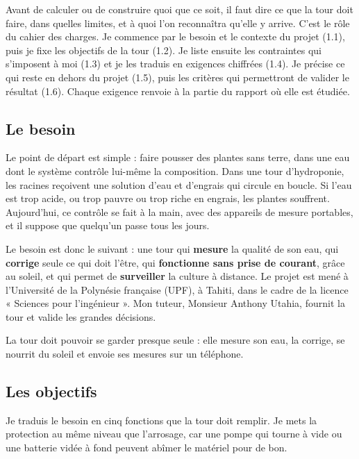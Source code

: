 \clearpage
{}

Avant de calculer ou de construire quoi que ce soit, il faut dire ce que la tour doit faire, dans quelles limites, et à quoi l'on reconnaîtra qu'elle y arrive. C'est le rôle du cahier des charges. Je commence par le besoin et le contexte du projet (1.1), puis je fixe les objectifs de la tour (1.2). Je liste ensuite les contraintes qui s'imposent à moi (1.3) et je les traduis en exigences chiffrées (1.4). Je précise ce qui reste en dehors du projet (1.5), puis les critères qui permettront de valider le résultat (1.6). Chaque exigence renvoie à la partie du rapport où elle est étudiée.

\subsection{Le besoin}

Le point de départ est simple : faire pousser des plantes sans terre, dans une eau dont le système contrôle lui-même la composition. Dans une tour d'hydroponie, les racines reçoivent une solution d'eau et d'engrais qui circule en boucle. Si l'eau est trop acide, ou trop pauvre ou trop riche en engrais, les plantes souffrent. Aujourd'hui, ce contrôle se fait à la main, avec des appareils de mesure portables, et il suppose que quelqu'un passe tous les jours.

Le besoin est donc le suivant : une tour qui \textbf{mesure} la qualité de son eau, qui \textbf{corrige} seule ce qui doit l'être, qui \textbf{fonctionne sans prise de courant}, grâce au soleil, et qui permet de \textbf{surveiller} la culture à distance. Le projet est mené à l'Université de la Polynésie française (UPF), à Tahiti, dans le cadre de la licence « Sciences pour l'ingénieur ». Mon tuteur, Monsieur Anthony Utahia, fournit la tour et valide les grandes décisions.

\begin{aretenir}
La tour doit pouvoir se garder presque seule : elle mesure son eau, la corrige, se nourrit du soleil et envoie ses mesures sur un téléphone.
\end{aretenir}

\subsection{Les objectifs}

Je traduis le besoin en cinq fonctions que la tour doit remplir. Je mets la protection au même niveau que l'arrosage, car une pompe qui tourne à vide ou une batterie vidée à fond peuvent abîmer le matériel pour de bon.

